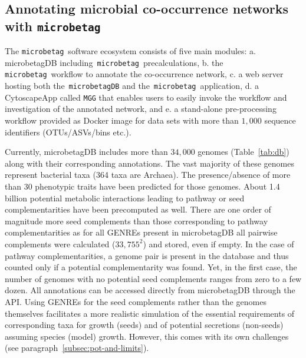 \documentclass[sn-mathphys,Numbered]{sn-jnl}  %
\theoremstyle{thmstyleone}%
\theoremstyle{thmstyletwo}%
\theoremstyle{thmstylethree}%
\newcommand{\microbetag}{\texttt{microbetag}}
\begin{document}
    \subsection*{Annotating microbial co-occurrence networks with \microbetag}
    \label{subsec:running-wf}

        The \microbetag~\space software ecosystem consists of five main modules:
        a. microbetagDB including~\microbetag~\space precalculations,
        b. the \microbetag~\space workflow to annotate the co-occurrence network,
        c. a web server hosting both the~\texttt{microbetagDB} and the~\microbetag~\space application,
        d. a CytoscapeApp called \texttt{MGG} that enables users to easily invoke the workflow and investigation of the annotated network, and
        e. a stand-alone pre-processing workflow provided as Docker image for data sets with more than $1,000$ sequence identifiers (OTUs/ASVs/bins etc.).

        Currently, microbetagDB includes more than $34,000$ genomes (Table~\ref{tab:db}) along with their corresponding annotations.
        The vast majority of these genomes represent bacterial taxa (364 taxa are Archaea).
        The presence/absence of more than 30 phenotypic traits have been predicted for those genomes.
        About 1.4 billion potential metabolic interactions leading to pathway or seed complementarities have been precomputed as well.
        There are one order of magnitude more seed complements than those corresponding to pathway complementarities as for all GENREs present in microbetagDB all pairwise complements were calculated ($33,755^2$) and stored, even if empty.
        In the case of pathway complementarities, a genome pair is present in the database and thus counted only if a potential complementarity was found.
        Yet, in the first case, the number of genomes with no potential seed complements ranges from zero to a few dozen.
        All annotations can be accessed directly from microbetagDB through the API.
        Using GENREs for the seed complements rather than the genomes themselves facilitates a more realistic simulation of the essential requirements of corresponding taxa for growth (seeds) and of potential secretions (non-seeds) assuming species (model) growth.
        However, this comes with its own challenges (see paragraph~\ref{subsec:pot-and-limits}). 
\end{document}
